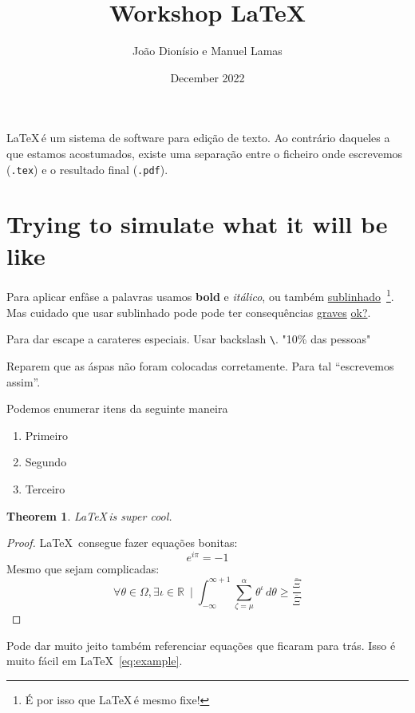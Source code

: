 \documentclass[10pt]{article}
\title{Workshop \LaTeX}
\author{João Dionísio e Manuel Lamas}
\date{December 2022}
\newtheorem{theorem}{Theorem}
\newcommand{\R}{\mathbb{R}}
\begin{document}
\maketitle
    
\LaTeX\,é um sistema de software para edição de texto. Ao contrário daqueles a que estamos acostumados, existe uma separação entre o ficheiro onde escrevemos (\verb|.tex|) e o resultado final (\verb|.pdf|).

\section{Trying to simulate what it will be like}



Para aplicar enfâse a palavras usamos \textbf{bold} e \emph{itálico}, ou também \underline{sublinhado}~\footnote{É por isso que \LaTeX\,é mesmo fixe!}. Mas cuidado que usar sublinhado pode pode ter consequências \underline{graves} \underline{ok?}.~\cite{how_to_cite_stuff}

Para dar escape a carateres especiais. Usar backslash \verb|\|.
"10\% das pessoas"

Reparem que as áspas não foram colocadas corretamente. Para tal ``escrevemos assim''.

Podemos enumerar itens da seguinte maneira
\begin{enumerate}
    \item Primeiro
    \item Segundo
    \item Terceiro
\end{enumerate}

\begin{theorem}
    \LaTeX\,is super cool.
\end{theorem}
\begin{proof}
\LaTeX\, consegue fazer equações bonitas:
\begin{equation} %
    e^{i\pi} = -1
\end{equation}
Mesmo que sejam complicadas:
\begin{equation} \label{eq:example}
    \forall \theta \in \Omega, \exists \iota \in \R~\mid \int_{-\infty}^{\infty+1}\sum_{\zeta=\mu}^{\alpha} \theta^{\iota} \, d\theta \geq \frac{\overline{\Xi}}{\overline{\Xi}} 
\end{equation}

\end{proof}

Pode dar muito jeito também referenciar equações que ficaram para trás. Isso é muito fácil em \LaTeX~\ref{eq:example}.
\end{document}

